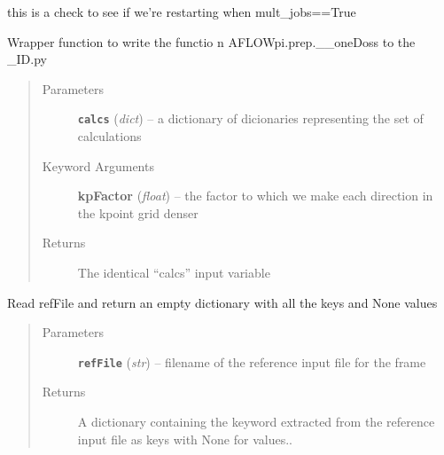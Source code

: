 \documentclass[letterpaper,10pt,english]{sphinxmanual}
\begin{document}

\begin{fulllineitems}
\label{prep:prep.construct_and_run}
this is a check to see if we're restarting when mult\_jobs==True

\end{fulllineitems}


\begin{fulllineitems}
\label{prep:prep.doss}
Wrapper function to write the functio n AFLOWpi.prep.\_\_oneDoss to the \_ID.py
\begin{quote}\begin{description}
\item[{Parameters}] \leavevmode
\textbf{\texttt{calcs}} (\emph{dict}) -- a dictionary of dicionaries representing the set of calculations

\item[{Keyword Arguments}] \leavevmode
\textbf{kpFactor} (\emph{float}) --
the factor to which we make each direction in the kpoint grid denser

\item[{Returns}] \leavevmode
The identical ``calcs'' input variable

\end{description}\end{quote}

\end{fulllineitems}


\begin{fulllineitems}
\label{prep:prep.extractvars}
Read refFile and return an empty dictionary with all the keys and None values
\begin{quote}\begin{description}
\item[{Parameters}] \leavevmode
\textbf{\texttt{refFile}} (\emph{str}) -- filename of the reference input file for the frame

\item[{Returns}] \leavevmode
A dictionary containing the keyword extracted from the reference input file
as keys with None for values..

\end{description}\end{quote}

\end{fulllineitems}
\end{document}
